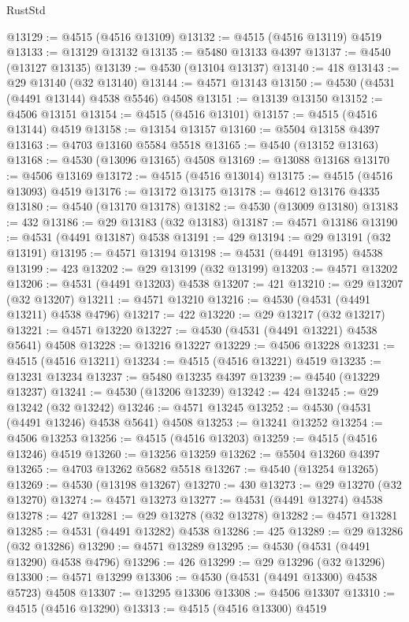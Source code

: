 \begin{lexlean}{RustStd}
\begin{coremodule}
@13129 := @4515 (@4516 @13109)
@13132 := @4515 (@4516 @13119) @4519
@13133 := @13129 @13132
@13135 := @5480 @13133 @4397
@13137 := @4540 (@13127 @13135)
@13139 := @4530 (@13104 @13137)
@13140 := 418
@13143 := @29 @13140 (@32 @13140)
@13144 := @4571 @13143
@13150 := @4530 (@4531 (@4491 @13144) @4538 @5546) @4508
@13151 := @13139 @13150
@13152 := @4506 @13151
@13154 := @4515 (@4516 @13101)
@13157 := @4515 (@4516 @13144) @4519
@13158 := @13154 @13157
@13160 := @5504 @13158 @4397
@13163 := @4703 @13160 @5584 @5518
@13165 := @4540 (@13152 @13163)
@13168 := @4530 (@13096 @13165) @4508
@13169 := @13088 @13168
@13170 := @4506 @13169
@13172 := @4515 (@4516 @13014)
@13175 := @4515 (@4516 @13093) @4519
@13176 := @13172 @13175
@13178 := @4612 @13176 @4335
@13180 := @4540 (@13170 @13178)
@13182 := @4530 (@13009 @13180)
@13183 := 432
@13186 := @29 @13183 (@32 @13183)
@13187 := @4571 @13186
@13190 := @4531 (@4491 @13187) @4538
@13191 := 429
@13194 := @29 @13191 (@32 @13191)
@13195 := @4571 @13194
@13198 := @4531 (@4491 @13195) @4538
@13199 := 423
@13202 := @29 @13199 (@32 @13199)
@13203 := @4571 @13202
@13206 := @4531 (@4491 @13203) @4538
@13207 := 421
@13210 := @29 @13207 (@32 @13207)
@13211 := @4571 @13210
@13216 := @4530 (@4531 (@4491 @13211) @4538 @4796)
@13217 := 422
@13220 := @29 @13217 (@32 @13217)
@13221 := @4571 @13220
@13227 := @4530 (@4531 (@4491 @13221) @4538 @5641) @4508
@13228 := @13216 @13227
@13229 := @4506 @13228
@13231 := @4515 (@4516 @13211)
@13234 := @4515 (@4516 @13221) @4519
@13235 := @13231 @13234
@13237 := @5480 @13235 @4397
@13239 := @4540 (@13229 @13237)
@13241 := @4530 (@13206 @13239)
@13242 := 424
@13245 := @29 @13242 (@32 @13242)
@13246 := @4571 @13245
@13252 := @4530 (@4531 (@4491 @13246) @4538 @5641) @4508
@13253 := @13241 @13252
@13254 := @4506 @13253
@13256 := @4515 (@4516 @13203)
@13259 := @4515 (@4516 @13246) @4519
@13260 := @13256 @13259
@13262 := @5504 @13260 @4397
@13265 := @4703 @13262 @5682 @5518
@13267 := @4540 (@13254 @13265)
@13269 := @4530 (@13198 @13267)
@13270 := 430
@13273 := @29 @13270 (@32 @13270)
@13274 := @4571 @13273
@13277 := @4531 (@4491 @13274) @4538
@13278 := 427
@13281 := @29 @13278 (@32 @13278)
@13282 := @4571 @13281
@13285 := @4531 (@4491 @13282) @4538
@13286 := 425
@13289 := @29 @13286 (@32 @13286)
@13290 := @4571 @13289
@13295 := @4530 (@4531 (@4491 @13290) @4538 @4796)
@13296 := 426
@13299 := @29 @13296 (@32 @13296)
@13300 := @4571 @13299
@13306 := @4530 (@4531 (@4491 @13300) @4538 @5723) @4508
@13307 := @13295 @13306
@13308 := @4506 @13307
@13310 := @4515 (@4516 @13290)
@13313 := @4515 (@4516 @13300) @4519

\end{coremodule}
\end{lexlean}
